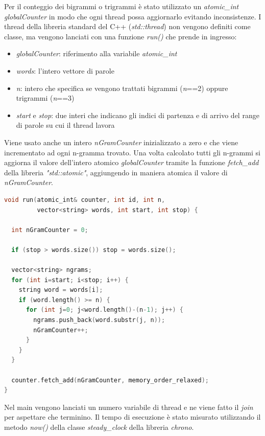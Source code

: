 \documentclass[10pt,twocolumn,letterpaper]{article}
\begin{document}
Per il conteggio dei bigrammi o trigrammi è stato utilizzato un \textit{atomic\_int} \textit{globalCounter} in modo che ogni thread possa aggiornarlo evitando inconsistenze.\newline
I thread della libreria standard del C++ (\textit{std::thread}) non vengono definiti come classe, ma vengono lanciati con una funzione \textit{run()} che prende in ingresso:
\begin{itemize}
	\item \textit{globalCounter}: riferimento alla variabile \textit{atomic\_int}
	\item \textit{words}: l'intero vettore di parole
	\item \textit{n}: intero che specifica se vengono trattati bigrammi (\textit{n}==2) oppure trigrammi (\textit{n}==3)
	\item \textit{start} e \textit{stop}: due interi che indicano gli indici di partenza e di arrivo del range di parole su cui il thread lavora
\end{itemize}
Viene usato anche un intero \textit{nGramCounter} inizializzato a zero e che viene incrementato ad ogni n-gramma trovato. Una volta calcolato tutti gli n-grammi si aggiorna il valore dell'intero atomico \textit{globalCounter} tramite la funzione \textit{fetch\_add} della libreria \textit{"std::atomic"}, aggiungendo in maniera atomica il valore di \textit{nGramCounter}.

\begin{lstlisting}[basicstyle=\scriptsize, language=C++, frame=single, caption={Esempio di funzione lanciata da un thread in C++},captionpos=b,showstringspaces=false]
void run(atomic_int& counter, int id, int n,
         vector<string> words, int start, int stop) {

  int nGramCounter = 0;

  if (stop > words.size()) stop = words.size();

  vector<string> ngrams;
  for (int i=start; i<stop; i++) {
    string word = words[i];
    if (word.length() >= n) {
      for (int j=0; j<word.length()-(n-1); j++) {
        ngrams.push_back(word.substr(j, n));
        nGramCounter++;
      }
    }
  }

  counter.fetch_add(nGramCounter, memory_order_relaxed);
}
\end{lstlisting}

Nel main vengono lanciati un numero variabile di thread e ne viene fatto il \textit{join} per aspettare che terminino.\newline
Il tempo di esecuzione è stato misurato utilizzando il metodo \textit{now()} della classe \textit{steady\_clock} della libreria \textit{chrono}.
\end{document}

